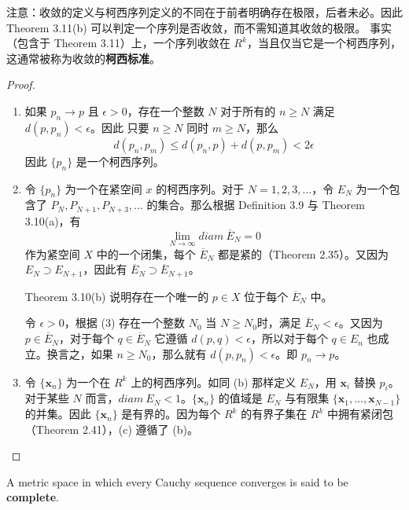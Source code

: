 \documentclass[../poma-notes.tex]{subfiles}
\begin{document}
注意：收敛的定义与柯西序列定义的不同在于前者明确存在极限，后者未必。因此 Theorem 3.11(b) 可以判定一个序列是否收敛，而不需知道其收敛的极限。
事实（包含于 Theorem 3.11）上，一个序列收敛在 $R^k$，当且仅当它是一个柯西序列，这通常被称为收敛的\textbf{柯西标准}。

\begin{proof}
  \begin{enumerate}[label=(\alph*)]
    \item 如果 $p_n \to p$ 且 $\epsilon > 0$，存在一个整数 $N$ 对于所有的 $n \ge N$ 满足 $d(p,p_n) < \epsilon$。因此
          只要 $n \ge N$ 同时 $m \ge N$，那么
          \[ d(p_n, p_m) \le d(p_n, p) + d(p, p_m) < 2\epsilon \]
          因此 $\{p_n\}$ 是一个柯西序列。
    \item 令 $\{p_n\}$ 为一个在紧空间 $x$ 的柯西序列。对于 $N=1,2,3,\dots$，令 $E_N$ 为一个包含了 $P_N,P_{N+1},P_{N+3},\dots$
          的集合。那么根据 Definition 3.9 与 Theorem 3.10(a)，有
          \begin{equation}
            \lim_{N \to \infty} diam\ \overline{E}_N = 0
          \end{equation}
          作为紧空间 $X$ 中的一个闭集，每个 $\overline{E}_N$ 都是紧的（Theorem 2.35）。又因为 $E_N \supset E_{N+1}$，因此有
          $\overline{E}_N \supset \overline{E}_{N+1}$。

          Theorem 3.10(b) 说明存在一个唯一的 $p \in X$ 位于每个 $\overline{E}_N$ 中。

          令 $\epsilon > 0$，根据 (3) 存在一个整数 $N_0$ 当 $N \ge N_0$时，满足 $\overline{E}_N < \epsilon$。又因为
          $p \in \overline{E}_N$，对于每个 $q \in \overline{E}_N$ 它遵循 $d(p,q) < \epsilon$，所以对于每个 $q \in E_n$
          也成立。换言之，如果 $n \ge N_0$，那么就有 $d(p,p_n)<\epsilon$。即 $p_n \to p$。
    \item 令 $\{\mathbf{x}_n\}$ 为一个在 $R^k$ 上的柯西序列。如同 (b) 那样定义 $E_N$，用 $\mathbf{x}_i$ 替换 $p_i$。对于某些
          $N$ 而言，$diam\ E_N<1$。$\{\mathbf{x}_n\}$ 的值域是 $E_N$ 与有限集 $\{\mathbf{x}_1,\dots,\mathbf{x}_{N-1}\}$
          的并集。因此 $\{\mathbf{x}_n\}$ 是有界的。因为每个 $R^k$ 的有界子集在 $R^k$ 中拥有紧闭包（Theorem 2.41），(c) 遵循了
          (b)。
  \end{enumerate}
\end{proof}

\begin{definition}
  A metric space in which every Cauchy sequence converges is said to be \textbf{complete}.
\end{definition}
\end{document}
